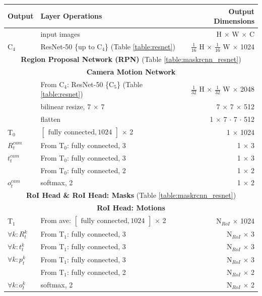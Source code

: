 {\begin{table}[h]
\centering
\begin{tabular}{llr}
\toprule
\textbf{Output} & \textbf{Layer Operations} & \textbf{Output Dimensions} \\
\midrule\midrule
& input images & H $\times$ W $\times$ C \\
\midrule
C$_4$ & ResNet-50 \{up to C$_4$\} (Table \ref{table:resnet}) & $\tfrac{1}{16}$ H $\times$ $\tfrac{1}{16}$ W $\times$ 1024 \\
\midrule
\multicolumn{3}{c}{\textbf{Region Proposal Network (RPN)} (Table \ref{table:maskrcnn_resnet})}\\
\midrule
\multicolumn{3}{c}{\textbf{Camera Motion Network}}\\
\midrule
& From C$_4$: ResNet-50 \{C$_5$\} (Table \ref{table:resnet}) & $\tfrac{1}{32}$ H $\times$ $\tfrac{1}{32}$ W $\times$ 2048 \\
& bilinear resize, 7 $\times$ 7 & 7 $\times$ 7 $\times$ 512 \\
& flatten & 1 $\times$ 7 $\cdot$ 7 $\cdot$ 512 \\
T$_0$ & $\begin{bmatrix}\textrm{fully connected}, 1024\end{bmatrix}$ $\times$ 2  & 1 $\times$ 1024 \\

$R_t^{cam}$& From T$_0$: fully connected, 3 & 1 $\times$ 3 \\
$t_t^{cam}$& From T$_0$: fully connected, 3 & 1 $\times$ 3 \\
& From T$_0$: fully connected, 2 & 1 $\times$ 2 \\
$o_t^{cam}$& softmax, 2 & 1 $\times$ 2 \\
\midrule
\multicolumn{3}{c}{\textbf{RoI Head \& RoI Head: Masks} (Table \ref{table:maskrcnn_resnet})}\\
\midrule
\multicolumn{3}{c}{\textbf{RoI Head: Motions}}\\
\midrule
T$_1$ & From ave: $\begin{bmatrix}\textrm{fully connected}, 1024\end{bmatrix}$ $\times$ 2 & N$_{RoI}$ $\times$ 1024 \\
$\forall k: R_t^k$ & From T$_1$: fully connected, 3 & N$_{RoI}$ $\times$ 3 \\
$\forall k: t_t^k$ & From T$_1$: fully connected, 3 & N$_{RoI}$ $\times$ 3 \\
$\forall k: p_t^k$ & From T$_1$: fully connected, 3 & N$_{RoI}$ $\times$ 3 \\
& From T$_1$: fully connected, 2 & N$_{RoI}$ $\times$ 2 \\
$\forall k: o_t^k$ & softmax, 2 & N$_{RoI}$ $\times$ 2 \\


\end{tabular}
\end{table}}
